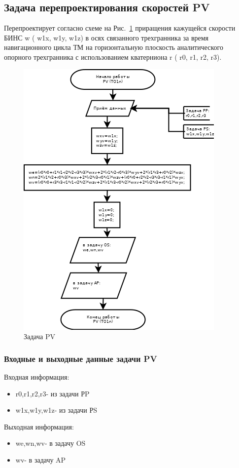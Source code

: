 \subsection{Задача перепроектирования скоростей PV}
Перепроектирует согласно схеме на Рис.~\ref{fig:PV} приращения  кажущейся скорости БИНС  w ( w1x, w1y, w1z)  
в осях связанного трехгранника  за время  навигационного  цикла  ТМ  на  горизонтальную плоскость аналитического  опорного трехгранника 
с использованием кватерниона  r ( r0,  r1,  r2,  r3).
\begin{figure}[H]
    \centering
    \includegraphics[width=0.5\linewidth]{images/PV.png}
    \caption{Задача PV}
    \label{fig:PV}
\end{figure}
\subsubsection{Входные и выходные данные задачи PV}
Входная информация:
\begin{itemize}
\item r0,r1,r2,r3- из задачи  РP
\item w1x,w1y,w1z- из задачи  РS 
\end{itemize}
Выходная информация:
\begin{itemize}
\item we,wn,wv- в задачу OS
\item wv- в задачу AP
\end{itemize}
\pagebreak
